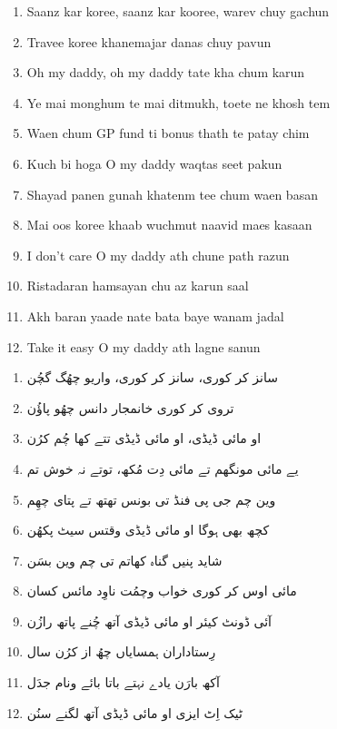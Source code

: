 \documentclass[12pt]{article}
\newcommand{\bigroman}[1]{\fontsize{16pt}{18pt}\selectfont\RaggedRight #1}
\newcommand{\bigarabic}[1]{\fontsize{16pt}{18pt}\selectfont \textarabic{#1}}
\begin{document}
\begin{multicols}{2}
\begin{enumerate}[leftmargin=*, label=\arabic*., font=\fontsize{16pt}{18pt}\selectfont]
  \item \bigroman{Saanz kar koree, saanz kar kooree, warev chuy gachun}
  \item \bigroman{Travee koree khanemajar danas chuy pavun}
  \item \bigroman{Oh my daddy, oh my daddy tate kha chum karun}
  \item \bigroman{Ye mai monghum te mai ditmukh, toete ne khosh tem}
  \item \bigroman{Waen chum GP fund ti bonus thath te patay chim}
  \item \bigroman{Kuch bi hoga O my daddy waqtas seet pakun}
  \item \bigroman{Shayad panen gunah khatenm tee chum waen basan}
  \item \bigroman{Mai oos koree khaab wuchmut naavid maes kasaan}
  \item \bigroman{I don't care O my daddy ath chune path razun}
  \item \bigroman{Ristadaran hamsayan chu az karun saal}
  \item \bigroman{Akh baran yaade nate bata baye wanam jadal}
  \item \bigroman{Take it easy O my daddy ath lagne sanun}
\end{enumerate}

\columnbreak

\begin{RTL}
\begin{enumerate}[leftmargin=*, label=\arabic*., font=\fontsize{16pt}{18pt}\selectfont]
  \item \bigarabic{سانز کر کوری، سانز کر کوری، واریو چھُگ گچُن}
  \item \bigarabic{تروی کر کوری خانمجار دانس چھُو پاؤُن}
  \item \bigarabic{او مائی ڈیڈی، او مائی ڈیڈی تتے کھا چُم کرُن}
  \item \bigarabic{یے مائی مونگھم تے مائی دِت مُکھ، توتے نہ خوش تم}
  \item \bigarabic{وین چم جی پی فنڈ تی بونس تھتھ تے پتای چھِم}
  \item \bigarabic{کچھ بھی ہوگا او مائی ڈیڈی وقتس سیٹ پکھُن}
  \item \bigarabic{شاید پنیں گناہ کھاتم تی چم وین بسَن}
  \item \bigarabic{مائی اوس کر کوری خواب وچمُت ناوِد مائس کسان}
  \item \bigarabic{آئی ڈونٹ کیئر او مائی ڈیڈی آتھ چُنے پاتھ رازُن}
  \item \bigarabic{رِستاداران ہمسایاں چھُ از کرُن سال}
  \item \bigarabic{آکھ بارَن یادے نہتے باتا بائے ونام جدَل}
  \item \bigarabic{ٹیک اِٹ ایزی او مائی ڈیڈی آتھ لگنے سنُن}
\end{enumerate}
\end{RTL}
\end{multicols}
\end{document}
